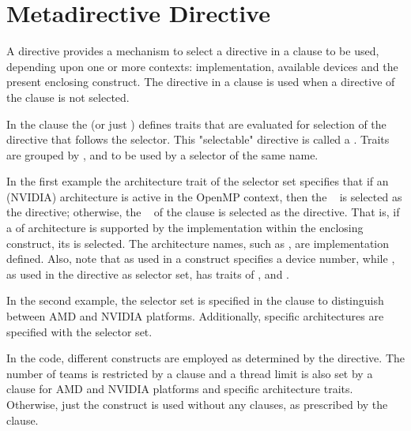\pagebreak
\section{Metadirective Directive}
\label{sec:metadirective}

A  directive provides a mechanism to select a directive in
a  clause to be used, depending upon one or more contexts:  
implementation, available devices and the present enclosing construct. 
The directive in a  clause is used when a directive of the 
 clause is not selected.

In the  clause the  (or just ) defines traits that are
evaluated for selection of the directive that follows the selector. 
This "selectable" directive is called a .
Traits are grouped by ,  and 
  to be used by a selector of the same name.

In the first example the architecture trait  of the 
 selector set specifies that if an  (NVIDIA) architecture is
active in the OpenMP context, then the ~ 
 is selected as the directive; otherwise, the ~
 of the  clause is selected as the directive.
That is, if a  of  architecture is supported by the implementation within
the enclosing  construct, its  is selected.
The architecture names, such as , are implementation defined.
Also, note that  as used in a  construct specifies
a device number, while , as used in the 
directive as selector set, has traits of ,  and .





In the second example, the  selector set is specified
in the  clause to distinguish between AMD and NVIDIA platforms. 
Additionally, specific architectures are specified with the  
selector set.

In the code, different  constructs are employed as determined
by the  directive.
The number of teams is restricted by a  clause
and a thread limit is also set by a  clause for 
 AMD and NVIDIA platforms and specific architecture
traits.  Otherwise, just the  construct is used without
any clauses, as prescribed by the  clause.


